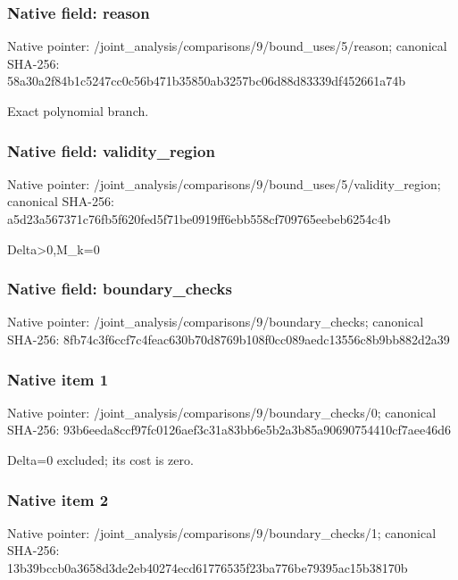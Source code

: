 \documentclass[10pt,a4paper]{article}
\begin{document}
\subsubsection{Native field: reason}
Native pointer: /joint\_\allowbreak{}analysis/comparisons/9/bound\_\allowbreak{}uses/5/reason; canonical SHA-256: 58a30a2f84b1c5247cc0c56b471b35850ab3257bc06d88d83339df452661a74b

\begingroup\raggedright\sloppy Exact polynomial branch.\par\endgroup

\subsubsection{Native field: validity\_\allowbreak{}region}
Native pointer: /joint\_\allowbreak{}analysis/comparisons/9/bound\_\allowbreak{}uses/5/validity\_\allowbreak{}region; canonical SHA-256: a5d23a567371c76fb5f620fed5f71be0919ff6ebb558cf709765eebeb6254c4b

\begingroup\raggedright\sloppy Delta>0,\allowbreak{}M\_\allowbreak{}k=\allowbreak{}0\par\endgroup

\subsubsection{Native field: boundary\_\allowbreak{}checks}
Native pointer: /joint\_\allowbreak{}analysis/comparisons/9/boundary\_\allowbreak{}checks; canonical SHA-256: 8fb74c3f6ccf7c4feac630b70d8769b108f0cc089aedc13556c8b9bb882d2a39

\subsubsection{Native item 1}
Native pointer: /joint\_\allowbreak{}analysis/comparisons/9/boundary\_\allowbreak{}checks/0; canonical SHA-256: 93b6eeda8ccf97fc0126aef3c31a83bb6e5b2a3b85a90690754410cf7aee46d6

\begingroup\raggedright\sloppy Delta=\allowbreak{}0 excluded;\allowbreak{} its cost is zero.\par\endgroup

\subsubsection{Native item 2}
Native pointer: /joint\_\allowbreak{}analysis/comparisons/9/boundary\_\allowbreak{}checks/1; canonical SHA-256: 13b39bccb0a3658d3de2eb40274ecd61776535f23ba776be79395ac15b38170b
\end{document}
